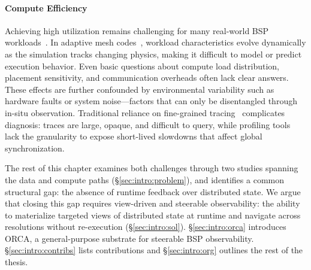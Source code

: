 \paragraph{Compute Efficiency}
Achieving high utilization remains challenging for many real-world BSP
workloads~\cite{Klenk2017:OverviewMPICharacteristics}.
In adaptive mesh codes~\cite{Dubey2014:Survey}, workload characteristics evolve dynamically as the
simulation tracks changing physics, making it difficult to model or predict execution behavior.
Even basic questions about compute load distribution, placement sensitivity, and communication
overheads often lack clear answers.
These effects are further confounded by environmental variability such as hardware faults or system
noise---factors that can only be disentangled through in-situ observation.
Traditional reliance on fine-grained tracing~\cite{Wylie2025:15Years,Eschw2012:OTF2} complicates
diagnosis: traces are large, opaque, and difficult to query, while profiling tools lack the
granularity to expose short-lived slowdowns that affect global synchronization.



The rest of this chapter examines both challenges through two studies spanning the data and compute
paths (\S\ref{sec:intro:problem}), and identifies a common structural gap: the absence of runtime
feedback over
distributed state.
We argue that closing this gap requires view-driven and steerable observability: the ability to
materialize targeted views of distributed state at runtime and navigate across resolutions without
re-execution (\S\ref{sec:intro:sol}).
\S\ref{sec:intro:orca} introduces ORCA, a general-purpose substrate for steerable BSP
observability.
\S\ref{sec:intro:contribs} lists contributions and \S\ref{sec:intro:org} outlines the rest of the
thesis.

